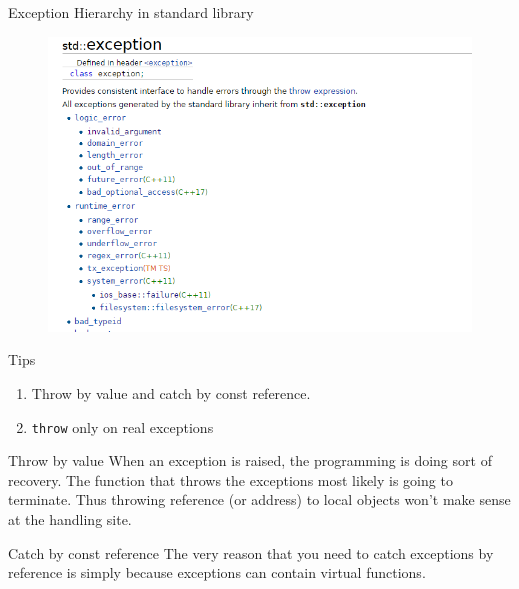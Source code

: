 \begin{frame}{Exception Hierarchy in standard library}
\vspace{-0.2in}
\begin{figure}
	\centering
	\includegraphics[scale=0.55]{fig/rc6stdexp}
\end{figure}
\end{frame}

\begin{frame}{Tips}
\begin{enumerate}
	\item Throw by value and catch by const reference.
	\item \texttt{throw} only on real exceptions
\end{enumerate}
\begin{block}{Throw by value}
	When an exception is raised, the programming is doing sort of recovery. The function that throws the exceptions most likely is going to terminate.
	Thus throwing reference (or address) to local objects won't make sense at the handling site.  
\end{block}
\begin{block}{Catch by const reference}
	The very reason that you need to catch exceptions by reference is simply because exceptions can contain virtual functions.
\end{block}
\end{frame}




